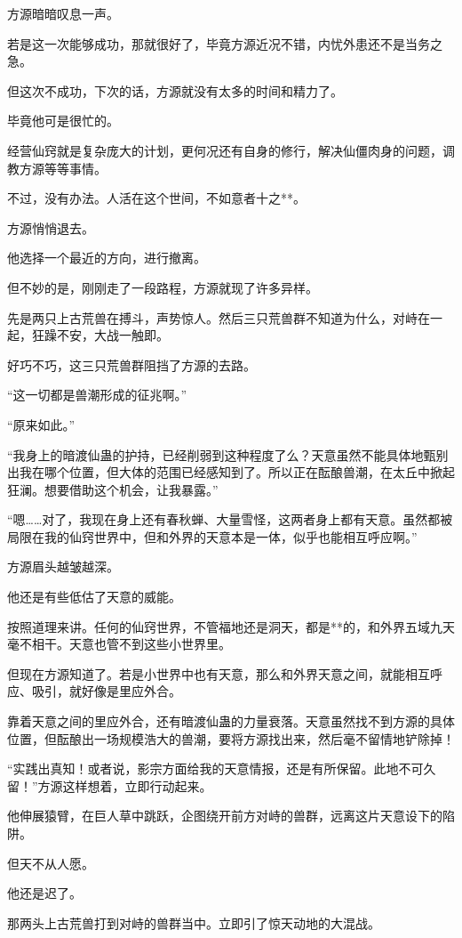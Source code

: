 \begin{this_body}
方源暗暗叹息一声。

若是这一次能够成功，那就很好了，毕竟方源近况不错，内忧外患还不是当务之急。

但这次不成功，下次的话，方源就没有太多的时间和精力了。

毕竟他可是很忙的。

经营仙窍就是复杂庞大的计划，更何况还有自身的修行，解决仙僵肉身的问题，调教方源等等事情。

不过，没有办法。人活在这个世间，不如意者十之**。

方源悄悄退去。

他选择一个最近的方向，进行撤离。

但不妙的是，刚刚走了一段路程，方源就现了许多异样。

先是两只上古荒兽在搏斗，声势惊人。然后三只荒兽群不知道为什么，对峙在一起，狂躁不安，大战一触即。

好巧不巧，这三只荒兽群阻挡了方源的去路。

“这一切都是兽潮形成的征兆啊。”

“原来如此。”

“我身上的暗渡仙蛊的护持，已经削弱到这种程度了么？天意虽然不能具体地甄别出我在哪个位置，但大体的范围已经感知到了。所以正在酝酿兽潮，在太丘中掀起狂澜。想要借助这个机会，让我暴露。”

“嗯……对了，我现在身上还有春秋蝉、大量雪怪，这两者身上都有天意。虽然都被局限在我的仙窍世界中，但和外界的天意本是一体，似乎也能相互呼应啊。”

方源眉头越皱越深。

他还是有些低估了天意的威能。

按照道理来讲。任何的仙窍世界，不管福地还是洞天，都是**的，和外界五域九天毫不相干。天意也管不到这些小世界里。

但现在方源知道了。若是小世界中也有天意，那么和外界天意之间，就能相互呼应、吸引，就好像是里应外合。

靠着天意之间的里应外合，还有暗渡仙蛊的力量衰落。天意虽然找不到方源的具体位置，但酝酿出一场规模浩大的兽潮，要将方源找出来，然后毫不留情地铲除掉！

“实践出真知！或者说，影宗方面给我的天意情报，还是有所保留。此地不可久留！”方源这样想着，立即行动起来。

他伸展猿臂，在巨人草中跳跃，企图绕开前方对峙的兽群，远离这片天意设下的陷阱。

但天不从人愿。

他还是迟了。

那两头上古荒兽打到对峙的兽群当中。立即引了惊天动地的大混战。


\end{this_body}
